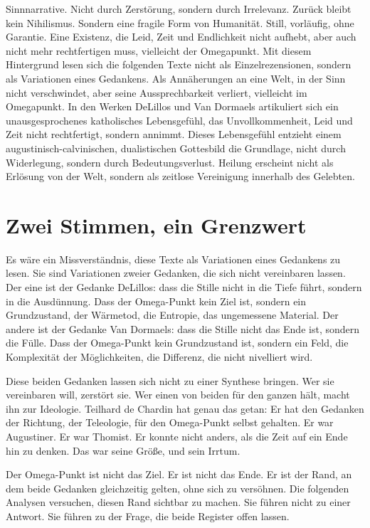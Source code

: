 \documentclass[
  ngerman,
]{article}
\begin{document}
Sinnnarrative. Nicht durch Zerstörung, sondern durch Irrelevanz. Zurück
bleibt kein Nihilismus. Sondern eine fragile Form von Humanität. Still,
vorläufig, ohne Garantie. Eine Existenz, die Leid, Zeit und Endlichkeit
nicht aufhebt, aber auch nicht mehr rechtfertigen muss, vielleicht der
Omegapunkt. Mit diesem Hintergrund lesen sich die folgenden Texte nicht
als Einzelrezensionen, sondern als Variationen eines Gedankens. Als
Annäherungen an eine Welt, in der Sinn nicht verschwindet, aber seine
Aussprechbarkeit verliert, vielleicht im Omegapunkt. In den Werken
DeLillos und Van Dormaels artikuliert sich ein unausgesprochenes
katholisches Lebensgefühl, das Unvollkommenheit, Leid und Zeit nicht
rechtfertigt, sondern annimmt. Dieses Lebensgefühl entzieht einem
augustinisch-calvinischen, dualistischen Gottesbild die Grundlage, nicht
durch Widerlegung, sondern durch Bedeutungsverlust. Heilung erscheint
nicht als Erlösung von der Welt, sondern als zeitlose Vereinigung
innerhalb des Gelebten.

\section{Zwei Stimmen, ein Grenzwert}\label{zwei-stimmen-ein-grenzwert}

Es wäre ein Missverständnis, diese Texte als Variationen eines Gedankens
zu lesen. Sie sind Variationen zweier Gedanken, die sich nicht
vereinbaren lassen. Der eine ist der Gedanke DeLillos: dass die Stille
nicht in die Tiefe führt, sondern in die Ausdünnung. Dass der
Omega-Punkt kein Ziel ist, sondern ein Grundzustand, der Wärmetod, die
Entropie, das ungemessene Material. Der andere ist der Gedanke Van
Dormaels: dass die Stille nicht das Ende ist, sondern die Fülle. Dass
der Omega-Punkt kein Grundzustand ist, sondern ein Feld, die Komplexität
der Möglichkeiten, die Differenz, die nicht nivelliert wird.

Diese beiden Gedanken lassen sich nicht zu einer Synthese bringen. Wer
sie vereinbaren will, zerstört sie. Wer einen von beiden für den ganzen
hält, macht ihn zur Ideologie. Teilhard de Chardin hat genau das getan:
Er hat den Gedanken der Richtung, der Teleologie, für den Omega-Punkt
selbst gehalten. Er war Augustiner. Er war Thomist. Er konnte nicht
anders, als die Zeit auf ein Ende hin zu denken. Das war seine Größe,
und sein Irrtum.

Der Omega-Punkt ist nicht das Ziel. Er ist nicht das Ende. Er ist der
Rand, an dem beide Gedanken gleichzeitig gelten, ohne sich zu versöhnen.
Die folgenden Analysen versuchen, diesen Rand sichtbar zu machen. Sie
führen nicht zu einer Antwort. Sie führen zu der Frage, die beide
Register offen lassen.
\end{document}
